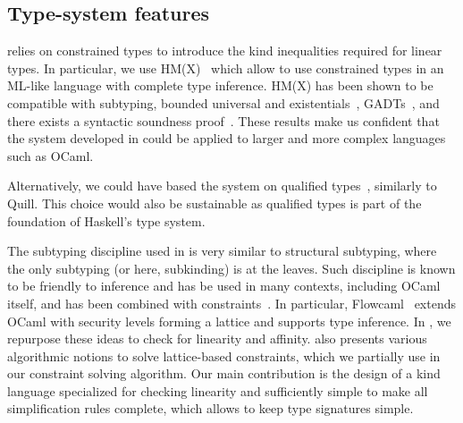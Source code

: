 \subsection{Type-system features}
%
\lang relies on constrained types
to introduce the kind inequalities required for linear types. In
particular, we use HM(X)~\citep{DBLP:journals/tapos/OderskySW99} which
allow to use constrained types in an ML-like language with complete
type inference.
HM(X) has been shown to be compatible with subtyping,
bounded universal and existentials~\citep{DBLP:conf/icfp/Simonet03},
GADTs~\citep{DBLP:journals/toplas/SimonetP07},
and there exists a syntactic soundness proof~\citep{DBLP:journals/entcs/SkalkaP02}.
These results make us confident that the system developed in \lang
could be applied to larger and more complex languages such as OCaml.

Alternatively, we could have based the system on qualified
types~\cite{DBLP:journals/scp/Jones94}, similarly to Quill. This
choice would also be sustainable as qualified types is part of the
foundation of Haskell's type system.

The subtyping discipline used in \lang is very similar
to structural subtyping, where the only subtyping (or here, subkinding)
is at the leaves.
Such discipline is known to be friendly to inference and has be used in many
contexts, including OCaml itself, and has been combined
with constraints~\citep{DBLP:journals/tapos/OderskySW99,DBLP:conf/sas/TrifonovS96}.
In particular, Flowcaml~\citep{DBLP:conf/popl/PottierS02}
extends OCaml with security levels forming a lattice and supports type inference.
In \lang, we repurpose these ideas to check for linearity and affinity.
\citet{DBLP:conf/aplas/Simonet03} also presents various algorithmic
notions to solve lattice-based constraints, which we partially use
in our constraint solving algorithm. Our main contribution
is the design of a kind language specialized for checking linearity
and sufficiently simple to make
all simplification rules complete, which allows to keep type signatures simple.


